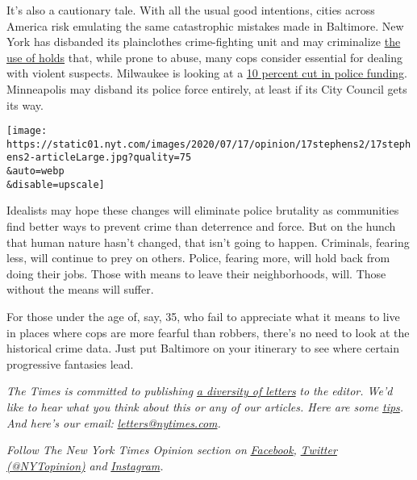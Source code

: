 It's also a cautionary tale. With all the usual good intentions, cities
across America risk emulating the same catastrophic mistakes made in
Baltimore. New York has disbanded its plainclothes crime-fighting unit
and may criminalize
\href{https://www.nydailynews.com/news/politics/ny-new-york-state-police-union-pull-out-of-city-reforms-20200715-uwcgecxovbfpxo3kxjej3otrby-story.html}{the
use of holds} that, while prone to abuse, many cops consider essential
for dealing with violent suspects. Milwaukee is looking at a
\href{https://www.jsonline.com/story/news/solutions/2020/07/14/mpd-chief-details-cuts-might-required-defund-police/5421894002/}{10
percent cut in police funding}. Minneapolis may disband its police force
entirely, at least if its City Council gets its way.

\texttt{[image: https://static01.nyt.com/images/2020/07/17/opinion/17stephens2/17stephens2-articleLarge.jpg?quality=75\\\&auto=webp\\\&disable=upscale]}

Idealists may hope these changes will eliminate police brutality as
communities find better ways to prevent crime than deterrence and force.
But on the hunch that human nature hasn't changed, that isn't going to
happen. Criminals, fearing less, will continue to prey on others.
Police, fearing more, will hold back from doing their jobs. Those with
means to leave their neighborhoods, will. Those without the means will
suffer.

For those under the age of, say, 35, who fail to appreciate what it
means to live in places where cops are more fearful than robbers,
there's no need to look at the historical crime data. Just put Baltimore
on your itinerary to see where certain progressive fantasies lead.

\emph{The Times is committed to publishing}
\href{https://www.nytimes.com/2019/01/31/opinion/letters/letters-to-editor-new-york-times-women.html}{\emph{a
diversity of letters}} \emph{to the editor. We'd like to hear what you
think about this or any of our articles. Here are some}
\href{https://help.nytimes.com/hc/en-us/articles/115014925288-How-to-submit-a-letter-to-the-editor}{\emph{tips}}\emph{.
And here's our email:}
\href{mailto:letters@nytimes.com}{\emph{letters@nytimes.com}}\emph{.}

\emph{Follow The New York Times Opinion section on}
\href{https://www.facebook.com/nytopinion}{\emph{Facebook}}\emph{,}
\href{http://twitter.com/NYTOpinion}{\emph{Twitter (@NYTopinion)}}
\emph{and}
\href{https://www.instagram.com/nytopinion/}{\emph{Instagram}}\emph{.}

